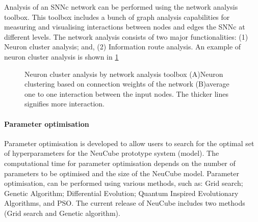 Analysis of an SNNc network can be performed using the network analysis toolbox. This toolbox includes a bunch of graph analysis capabilities for measuring and visualising interactions between nodes and edges the SNNc at different levels. The network analysis consists of two major functionalities: (1) Neuron cluster analysis; and, (2) Information route analysis. An example of neuron cluster analysis is shown in \figurename \ref{fig:cluster_analysis} 

\begin{figure}
	\centering
	\hfil
	\centering
	\caption{Neuron cluster analysis by network analysis toolbox (A)Neuron clustering based on connection weights of the network (B)average one to one interaction between the input nodes. The thicker lines signifies more interaction.}
	\label{fig:cluster_analysis}
\end{figure}

\paragraph{Parameter optimisation}

Parameter optimisation is developed to allow users to search for the optimal set of hyperparameters for the NeuCube prototype system (model). The computational time for parameter optimisation depends on the number of parameters to be optimised and the size of the NeuCube model. Parameter optimisation, can be performed using various methods, such as: Grid search; Genetic Algorithm; Differential Evolution; Quantum Inspired Evolutionary Algorithms, and PSO. The current release of NeuCube includes two methods (Grid search and Genetic algorithm).


